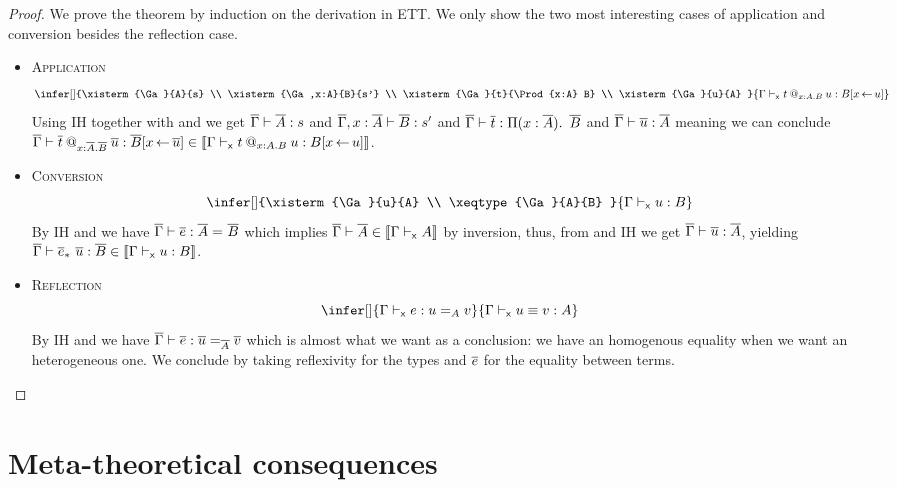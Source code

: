 \begin{proof}
  We prove the theorem by induction on the derivation in \acrshort{ETT}.
  We only show the two most interesting cases of application and conversion
  besides the reflection case.

  \begin{itemize}
    \item \textsc{Application}
    \[
      \infer[]
        {\xisterm{\Ga}{A}{s} \\
         \xisterm{\Ga,x:A}{B}{s'} \\
         \xisterm{\Ga}{t}{\Prod{x:A} B} \\
         \xisterm{\Ga}{u}{A}
        }
        {\xisterm{\Ga}{\app{t}{x:A}{B}{u}}{B[x \sto u]}}
    \]
    Using IH together with  and 
    we get $\overline{\Gamma} \vdash \overline{A} : s$ and $\overline{\Gamma},x:\overline{A} \vdash \overline{B} : s'$ and
    $\overline{\Gamma} \vdash \overline{t} : \mathop{\Pi(x:\overline{A}).\ } \overline{B}$ and $\overline{\Gamma} \vdash \overline{u} : \overline{A}$
    meaning we can conclude
    $\overline{\Gamma} \vdash \overline{t}\mathbin{@_{x:\overline{A}.\overline{B}}} \overline{u} : \overline{B}[x \mathop{\leftarrow} \overline{u}]
    \in \llbracket \Gamma \vdash_{\mathsf{x}} t\mathbin{@_{x:A.B}} u : B[x \mathop{\leftarrow} u] \rrbracket$.

    \item \textsc{Conversion}
    \[
      \infer[]
        {\xisterm{\Ga}{u}{A} \\
         \xeqtype{\Ga}{A}{B}
        }
        {\xisterm{\Ga}{u}{B}}
    \]
    By IH and  we have
    $\overline{\Gamma} \vdash \overline{e} : \overline{A} =_{} \overline{B}$ which implies
    $\overline{\Gamma} \vdash \overline{A} \in \llbracket \Gamma \vdash_{\mathsf{x}} A \rrbracket$ by
    inversion, thus, from 
    and IH we get $\overline{\Gamma} \vdash \overline{u} : \overline{A}$, yielding
    $\overline{\Gamma} \vdash \overline{e}_*\ \overline{u} : \overline{B} \in \llbracket \Gamma \vdash_{\mathsf{x}} u : B \rrbracket$.

    \item \textsc{Reflection}
    \[
      \infer[]
        {\xisterm{\Ga}{e}{\Eq{A}{u}{v}}}
        {\xeqterm{\Ga}{u}{v}{A}}
    \]
    By IH and  we have $\overline{\Gamma} \vdash \overline{e} : \overline{u} =_{\overline{A}} \overline{v}$
    which is almost what we want as a conclusion: we have an homogenous equality
    when we want an heterogeneous one. We conclude by taking reflexivity for
    the types and \(\overline{e}\) for the equality between terms.
  \end{itemize}

\end{proof}


\section{Meta-theoretical consequences}

